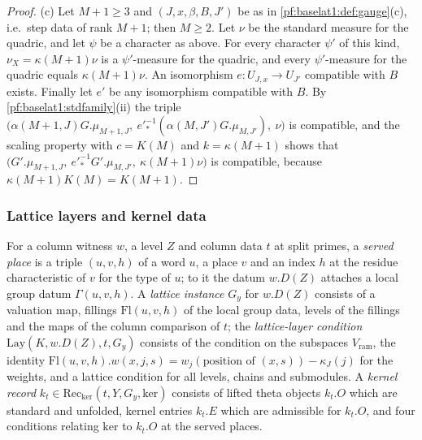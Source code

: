 \begin{proof}
(c) Let $M+1\ge3$ and $(J,x,\beta,B,J')$ be as in \cref{pf:baselat1:def:gauge}(c), i.e.\ step data of rank $M+1$; then
$M\ge2$. Let $\nu$ be the standard measure for the quadric, and let $\psi$ be a character as above. For every
character $\psi'$ of this kind, $\nu_X=\kappa(M+1)\nu$ is a $\psi'$-measure for the quadric, and every
$\psi'$-measure for the quadric equals $\kappa(M+1)\nu$. An isomorphism $e\colon U_{J,x}\to U_{J'}$ compatible with $B$
exists. Finally let $e'$ be any isomorphism compatible with $B$. By \cref{pf:baselat1:stdfamily}(ii) the triple
$\bigl(\alpha(M+1,J)G.\mu_{M+1,J},\ e'^{-1}_*(\alpha(M,J')G.\mu_{M,J'}),\ \nu\bigr)$ is compatible, and the scaling property
with $c=K(M)$ and $k=\kappa(M+1)$ shows that
$\bigl(G'.\mu_{M+1,J},\ e'^{-1}_*G'.\mu_{M,J'},\ \kappa(M+1)\nu\bigr)$ is compatible, because
$\kappa(M+1)K(M)=K(M+1)$.
\end{proof}

\subsubsection{Lattice layers and kernel data}\label{pf:baselat1:sssec:latproofs}

\begin{definition}\label{pf:baselat1:def:latinst}
For a column witness $w$, a level $Z$ and column data $t$ at split primes, a \emph{served place} is a triple
$(u,v,h)$ of a word $u$, a place $v$ and an index $h$ at the residue characteristic of $v$ for the type of $u$; to it
the datum $w.D(Z)$ attaches a local group datum $\Gamma(u,v,h)$. A \emph{lattice instance} $G_y$ for $w.D(Z)$
consists of a valuation map, fillings $\mathrm{Fl}(u,v,h)$ of the local group data, levels of the fillings and the
maps of the column comparison of $t$; the \emph{lattice-layer condition} $\mathrm{Lay}(K,w.D(Z),t,G_y)$ consists of
the condition on the subspaces $V_{\mathrm{ram}}$, the identity
$\mathrm{Fl}(u,v,h).w(x,j,s)=w_j(\text{position of }(x,s))-\kappa_J(j)$ for the weights, and a lattice condition for
all levels, chains and submodules. A \emph{kernel record} $k_t\in\mathrm{Rec}_{\ker}(t,Y,G_y,\mathrm{ker})$ consists of
lifted theta objects $k_t.O$ which are standard and unfolded, kernel entries $k_t.E$ which are admissible for $k_t.O$,
and four conditions relating $\mathrm{ker}$ to $k_t.O$ at the served places.
\end{definition}

